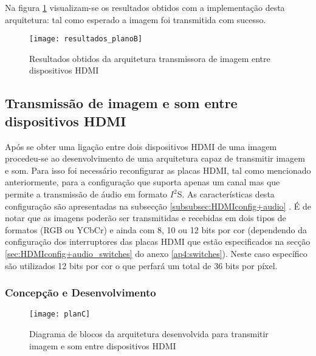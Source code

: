 Na figura \ref{fig:resultados_planoB} visualizam-se os resultados obtidos com a implementação desta arquitetura: tal como esperado a imagem foi transmitida com sucesso.

\begin{figure}[h!]
	\begin{center}
		\leavevmode
		\texttt{[image: resultados\_planoB]}
		\caption{Resultados obtidos da arquitetura transmissora de imagem entre dispositivos HDMI}
		\label{fig:resultados_planoB}
	\end{center}
\end{figure}

\begin{center}
\end{center}


\subsection{Transmissão de imagem e som entre dispositivos HDMI}

Após se obter uma ligação entre dois dispositivos HDMI de uma imagem procedeu-se ao desenvolvimento de uma arquitetura capaz de transmitir imagem e som. Para isso foi necessário reconfigurar as placas HDMI, tal como mencionado anteriormente, para a configuração que suporta apenas um canal mas que permite a transmissão de áudio em formato $I^{2}$S. As características desta configuração são apresentadas na subsecção \ref{subsubsec:HDMIconfig+audio} . É de notar que as imagens poderão ser transmitidas e recebidas em dois tipos de formatos (RGB ou YCbCr) e ainda com 8, 10 ou 12 bits por cor (dependendo da configuração dos interruptores das placas HDMI que estão especificados na secção \ref{sec:HDMIconfig+audio_switches} do anexo \ref{ap4:switches}). Neste caso específico são utilizados 12 bits por cor o que perfará um total de 36 bits por píxel.

\subsubsection*{Concepção e Desenvolvimento}

\begin{figure}[h!]
	\begin{center}
		\leavevmode
		\texttt{[image: planC]}
		\caption{Diagrama de blocos da arquitetura desenvolvida para transmitir imagem e som entre dispositivos HDMI}
		\label{fig:planC}
	\end{center}
\end{figure}


